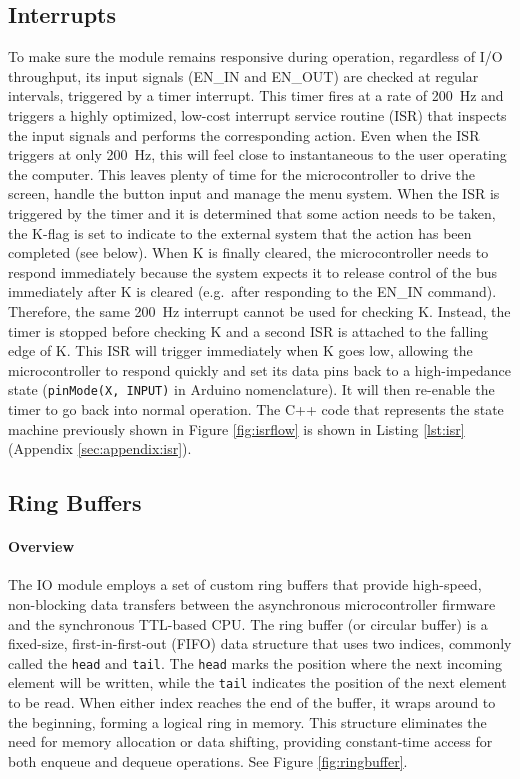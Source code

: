\subsection{Interrupts}
To make sure the module remains responsive during operation, regardless of I/O throughput, its input signals (EN\_IN and EN\_OUT) are checked at regular intervals, triggered by a timer interrupt. This timer fires at a rate of 200~Hz and triggers a highly optimized, low-cost interrupt service routine (ISR) that inspects the input signals and performs the corresponding action. Even when the ISR triggers at only 200~Hz, this will feel close to instantaneous to the user operating the computer. This leaves plenty of time for the microcontroller to drive the screen, handle the button input and manage the menu system. When the ISR is triggered by the timer and it is determined that some action needs to be taken, the K-flag is set to indicate to the external system that the action has been completed (see below). When K is finally cleared, the microcontroller needs to respond immediately because the system expects it to release control of the bus immediately after K is cleared (e.g.~after responding to the EN\_IN command). Therefore, the same 200~Hz interrupt cannot be used for checking K. Instead, the timer is stopped before checking K and a second ISR is attached to the falling edge of K. This ISR will trigger immediately when K goes low, allowing the microcontroller to respond quickly and set its data pins back to a high-impedance state (\texttt{pinMode(X, INPUT)} in Arduino nomenclature). It will then re-enable the timer to go back into normal operation. The C++ code that represents the state machine previously shown in Figure \ref{fig:isrflow} is shown in Listing \ref{lst:isr} (Appendix \ref{sec:appendix:isr}).


\subsection{Ring Buffers}
\paragraph{Overview} The IO module employs a set of custom ring buffers that provide high-speed, non-blocking data transfers between the asynchronous microcontroller firmware and the synchronous TTL-based CPU. The ring buffer (or circular buffer) is a fixed-size, first-in-first-out (FIFO) data structure that uses two indices, commonly called the \texttt{head} and \texttt{tail}. The \texttt{head} marks the position where the next incoming element will be written, while the \texttt{tail} indicates the position of the next element to be read. When either index reaches the end of the buffer, it wraps around to the beginning, forming a logical ring in memory. This structure eliminates the need for memory allocation or data shifting, providing constant-time access for both enqueue and dequeue operations. See Figure \ref{fig:ringbuffer}.

